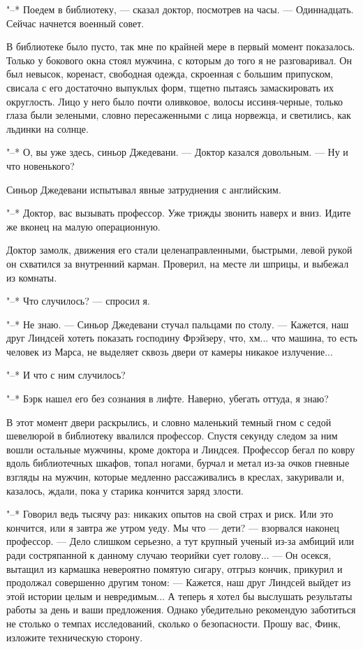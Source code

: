 "--*  Поедем  в  библиотеку,  ---  сказал  доктор,  посмотрев  на  часы.   ---
Одиннадцать. Сейчас начнется военный совет.

В библиотеке было пусто, так  мне  по  крайней  мере  в  первый  момент
показалось. Только у бокового окна стоял мужчина, с которым до того  я  не
разговаривал. Он был невысок,  коренаст,  свободная  одежда,  скроенная  с
большим припуском, свисала с его достаточно выпуклых форм, тщетно  пытаясь
замаскировать их округлость. Лицо у  него  было  почти  оливковое,  волосы
иссиня-черные, только глаза были зелеными,  словно  пересаженными  с  лица
норвежца, и светились, как льдинки на солнце.

"--* О, вы уже здесь, синьор Джедевани. --- Доктор казался довольным. --- Ну и
что новенького?

Синьор Джедевани испытывал явные затруднения с английским.

"--* Доктор, вас вызывать профессор. Уже трижды  звонить  наверх  и  вниз.
Идите же вконец на малую операционную.

Доктор замолк, движения его стали  целенаправленными,  быстрыми,  левой
рукой он схватился за внутренний карман. Проверил, на месте ли  шприцы,  и
выбежал из комнаты.

"--* Что случилось? --- спросил я.

"--* Не знаю. --- Синьор Джедевани стучал пальцами по столу. --- Кажется,  наш
друг Линдсей хотеть показать господину Фрэйзеру, что, хм... что машина, то
есть человек  из  Марса,  не  выделяет  сквозь  двери  от  камеры  никакое
излучение...

"--* И что с ним случилось?

"--* Бэрк нашел его без сознания в лифте. Наверно, убегать оттуда, я знаю?

В этот момент двери раскрылись, и словно маленький темный гном с  седой
шевелюрой в библиотеку ввалился профессор. Спустя секунду  следом  за  ним
вошли остальные мужчины, кроме доктора и Линдсея. Профессор бегал по ковру
вдоль библиотечных шкафов,  топал  ногами,  бурчал  и  метал  из-за  очков
гневные взгляды на  мужчин,  которые  медленно  рассаживались  в  креслах,
закуривали и, казалось, ждали, пока у старика кончится заряд злости.

"--* Говорил ведь тысячу раз: никаких опытов на свой страх и риск. Или это
кончится, или я завтра же утром уеду. Мы что --- дети? ---  взорвался  наконец
профессор. --- Дело слишком серьезно, а тут крупный ученый из-за амбиций или
ради состряпанной к данному случаю теорийки сует голову...  ---  Он  осекся,
вытащил из кармашка невероятно помятую сигару, отгрыз кончик,  прикурил  и
продолжал совершенно другим тоном: --- Кажется, наш друг Линдсей  выйдет  из
этой  истории  целым  и  невредимым...  А  теперь  я  хотел  бы  выслушать
результаты  работы  за  день  и  ваши  предложения.   Однако   убедительно
рекомендую  заботиться  не  столько  о  темпах  исследований,  сколько   о
безопасности. Прошу вас, Финк, изложите техническую сторону.

